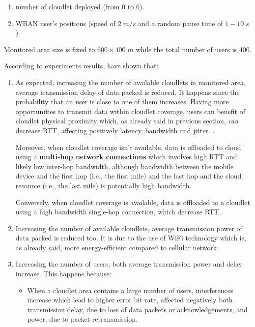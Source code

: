 \documentclass[sigchi]{acmart}
\begin{document}
\begin{enumerate}
\item number of cloudlet deployed (from 0 to 6).
\item WBAN user's positions (speed of $2\;m/s$ and a random pause time of $1-10\;s$)
\end{enumerate}

Monitored area size is fixed to $600 \times 400\;m$ while the total number of users is $400$.

According to experiments results, \cite{MSAReport} have shown that:

\begin{enumerate}

\item As expected, increasing the number of available cloudlets in monitored area, average transmission delay of data packed is reduced. It happens since the probability  that an user is close to one of them increases. Having more opportunities to transmit data within cloudlet coverage, users can benefit of cloudlet physical proximity which, as already said in previous section, \textit{can} decrease RTT, affecting positively latency, bandwidth and jitter. \cite{TheEmergenceOfEdgeComputing}. 

Moreover, when cloudlet coverage isn't available, data is offloaded to cloud using a \textbf{multi-hop network connections} which involves high RTT and likely low inter-hop bandwidth, although bandwidth between the mobile device and the first hop (i.e., the first mile) and the last hop and the cloud resource (i.e., the last mile) is potentially high bandwidth.\cite{ArchitecturalTacticsCyberForaging}

Conversely, when cloudlet coverage is available, data is offloaded to a cloudlet using a high bandwidth single-hop connection, which decrease RTT.

\item Increasing the number of available cloudlets, average transmission power of data packed is reduced too. It is due to the use of WiFi technology which is, as already said, more energy-efficient compared to cellular network.

\item Increasing the number of users, both average transmission power and delay increase. This happens because:

\begin{itemize}
\item When a cloudlet area contains a large number of users, interferences increase which lead to higher error bit rate, affected negatively both transmission delay, due to loss of data packets or acknowledgements, and power, due to packet retransmission.


\end{itemize}
\end{enumerate}
\end{document}
